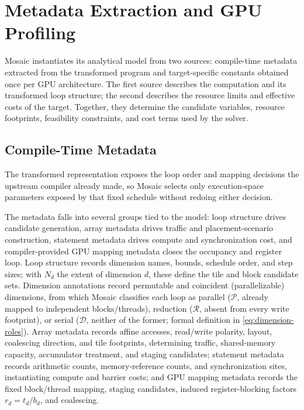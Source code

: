 \documentclass[acmsmall,review,anonymous,screen]{acmart}
\newcommand{\name}{{Mosaic}\xspace}
\newcommand{\gpu}{GPU\xspace}
\newcommand{\tile}{t}
\newcommand{\rblk}{r}
\begin{document}
\section{Metadata Extraction and GPU Profiling}
\label{sec:metadata}

\name instantiates its analytical model from two sources: compile-time metadata extracted from the transformed program and target-specific constants obtained once per \gpu architecture. The first source describes the computation and its transformed loop structure; the second describes the resource limits and effective costs of the target. Together, they determine the candidate variables, resource footprints, feasibility constraints, and cost terms used by the solver.

\subsection{Compile-Time Metadata}
\label{sec:compile-time-metadata}

The transformed representation exposes the loop order and mapping decisions the upstream compiler already made, so \name selects only execution-space parameters exposed by that fixed schedule without redoing either decision.

The metadata falls into several groups tied to the model: loop structure drives candidate generation, array metadata drives traffic and placement-scenario construction, statement metadata drives compute and synchronization cost, and compiler-provided GPU mapping metadata closes the occupancy and register loop. Loop structure records dimension names, bounds, schedule order, and step sizes; with \(N_d\) the extent of dimension \(d\), these define the tile and block candidate sets. Dimension annotations record permutable and coincident (parallelizable) dimensions, from which \name classifies each loop as parallel (\(\mathcal{P}\), already mapped to independent blocks/threads), reduction (\(\mathcal{R}\), absent from every write footprint), or serial (\(\mathcal{D}\), neither of the former; formal definition in \autoref{eq:dimension-roles}). Array metadata records affine accesses, read/write polarity, layout, coalescing direction, and tile footprints, determining traffic, shared-memory capacity, accumulator treatment, and staging candidates; statement metadata records arithmetic counts, memory-reference counts, and synchronization sites, instantiating compute and barrier costs; and GPU mapping metadata records the fixed block/thread mapping, staging candidates, induced register-blocking factors \(\rblk_d=\tile_d/b_d\), and coalescing.
\end{document}

